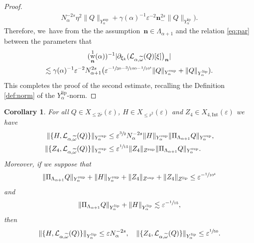 \documentclass[10pt,a4paper]{amsart}
\DeclareMathOperator{\rw}{w}
\theoremstyle{plain}
\newtheorem{corollary}[theorem]{Corollary}
\theoremstyle{definition}
\newcommand{\nb}{{\boldsymbol n}}
\newcommand{\1}{\mathbf{1}}
\newcommand{\Ysup}[1]{Y_{#1}^{\mathrm{sup}}}
\newcommand{\Ylip}[1]{Y_{#1}^{\mathrm{lip}}}
\let\epsilon\varepsilon
\begin{document}
\begin{proof}
\begin{align*}
N_{\alpha}^{-2s}\eta^{2}\|Q\|_{\Ysup{\alpha}}
+
\gamma(\alpha)^{-1}\epsilon^{-2}\nb_{-}^{2s}
\|Q\|_{\Ylip{\alpha}}
\Big).
\end{align*}
Therefore, we~have from the the assumption~$\nb\in\Lambda_{\alpha+1}$ and the relation \eqref{eq:par} between the parameters that
\begin{multline*}
(\rw_{\nb}^{1}(\alpha))^{-1}
|
\partial_{\xi_{k}}
(
\mathcal{L}_{\alpha,\widetilde{\omega}}(Q)[\xi]
\bigr)_{\nb}
|\\
\lesssim \gamma(\alpha)^{-1}\epsilon^{-2}N_{\alpha+1}^{2s}\bigl(
\epsilon^{-\sfrac{1}{30}-\sfrac{3}{100}-\sfrac{1}{10^{4}}}
\|Q\|_{\Ysup{\alpha}}
+
\|Q\|_{\Ylip{\alpha}}
).
\end{multline*}
This completes the proof of the second estimate, recalling the Definition \ref{def:norm} of the $\Ylip{\alpha}$-norm.
\end{proof}
\begin{corollary}
\label{cor:ad}
For all $Q\in X_{\leq2\overline{r}}(\epsilon)$, $H\in X_{\leq\overline{r}^{2}}(\epsilon)$ and $Z_{4}\in X_{4,\mathrm{Int}}(\epsilon)$ we have
\begin{align*}
\|\{H,\mathcal{L}_{\alpha,\widetilde{\omega}}(Q)\}\|_{\Ysup{\alpha}}
&\leq \epsilon^{\sfrac{3}{2}}N_{\alpha}^{-2s}
\|H\|_{\Ysup{\alpha}}
\|\Pi_{\Lambda_{\alpha+1}}Q\|_{\Ysup{\alpha}},\\
\|\{Z_{4},\mathcal{L}_{\alpha,\widetilde{\omega}}(Q)\}\|_{\Ysup{\alpha}}
&\leq \epsilon^{\sfrac{1}{15}}
\|Z_{4}\|_{Z^{\mathrm{sup}}}
\|\Pi_{\Lambda_{\alpha+1}}Q\|_{\Ysup{\alpha}}.
\end{align*}
Moreover, if we suppose that
\begin{equation}
\label{eq:as-14}
\|\Pi_{\Lambda_{\alpha+1}}Q\|_{\Ysup{\alpha}}
+\|H\|_{\Ysup{\alpha}}
+\|Z_{4}\|_{Z^{\mathrm{sup}}}
+
\|Z_{4}\|_{Z^{\mathrm{lip}}}
\leq \epsilon^{-\sfrac{1}{10^{3}}}
\end{equation}
and
\begin{equation}
\label{eq:as-15}
\|\Pi_{\Lambda_{\alpha+1}}Q\|_{\Ylip{\alpha}}+\|H\|_{\Ylip{\alpha}}\lesssim \epsilon^{-\sfrac{1}{15}},
\end{equation}
then
\[
\|\{H,\mathcal{L}_{\alpha,\widetilde{\omega}}(Q)\}\|_{\Ylip{\alpha}}
\leq \epsilon N_{\alpha}^{-2s},\quad
\|\{Z_{4},\mathcal{L}_{\alpha,\widetilde{\omega}}(Q)\}\|_{\Ylip{\alpha}}
\leq \epsilon^{\sfrac{1}{50}}.
\]
\end{corollary}
\end{document}
